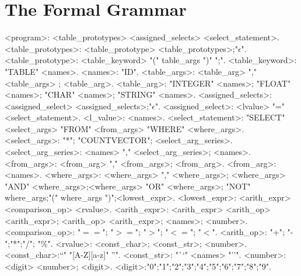 \documentclass[10pt,fullpage]{article}
\begin{document}
\section{The Formal Grammar}
\begin{grammar}
<program>: <table\_prototypes> <assigned\_selects>
<select\_statement>.
<table\_prototypes>: <table\_prototype>
<table\_prototypes>;"$\epsilon$".
<table\_prototype>: <table\_keyword> "(" table\_args ")" ";".
<table\_keyword>: "TABLE" <names>.
<names>: "ID".
<table\_args>: <table\_arg> "," <table\_args> ; <table\_arg>.
<table\_arg>: "INTEGER" <names>; "FLOAT" <names>; "CHAR" <names>;
"STRING" <names>.
<assigned\_selects>: <assigned\_select> <assigned\_selects>;"$\epsilon$".
<assigned\_select>: <lvalue> "=" <select\_statement>.
<l\_value>: <names>.
<select\_statement>: "SELECT" <select\_args> "FROM" <from\_args>
"WHERE" <where\_args>.
<select\_args>: "*"; "COUNTVECTOR"; <select\_arg\_series>.
<select\_arg\_series>: <names> "," <select\_arg\_series>; <names>.
<from\_args>: <from\_arg> "," <from\_args>; <from\_arg>.
<from\_arg>: <names>.
<where\_args>: <where\_args> "," <where\_args>;
<where\_args> "AND" <where\_args>;<where\_args> "OR" <where\_args>;
"NOT" where\_args;"(" where\_args ")";<lowest\_expr>.
<lowest\_expr>: <arith\_expr> <comparison\_op> <rvalue>.
<arith\_expr>: <arith\_expr> <arith\_op> <arith\_expr>;
<arith\_op> <arith\_expr>;
<names>;
<number>.
<comparison\_op>: "$==$"; "$>=$"; "$>$"; "$<=$"; "$<$".
<arith\_op>: "+"; "-";"*";"/"; "\%".
<rvalue>: <const\_char>; <const\_str>; <number>.
<const\_char>:"`" "[A-Z][a-z]" "'".
<const\_str>: "``" <names> "''".
<number>: <digit> <number>; <digit>.
<digit>:"0";"1";"2";"3";"4";"5";"6";"7";"8";"9".

\end{grammar}
\end{document}
